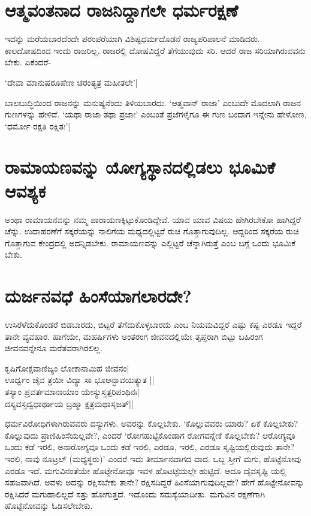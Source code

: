 \section*{ಆತ್ಮವಂತನಾದ ರಾಜನಿದ್ದಾಗಲೇ ಧರ್ಮರಕ್ಷಣೆ}

ಇದನ್ನು ಮರೆಯಬಾರದೆಂದೇ ಪರಂಪರೆಯಾಗಿ ವಿಶಿಷ್ಟಧರ್ಮದೊಡನೆ ರಾಜ್ಯಪರಿಪಾಲನೆ ಮಾಡಿದರು. ಕಾಲದೋಷದಿಂದ ಇಂದು ರಾಜರಿಲ್ಲ. ರಾಜರಲ್ಲಿ ದೋಷವಿದ್ದರೆ ತೆಗೆಯುವುದು ಸರಿ. ಆದರೆ ರಾಜ ಸರಿಯಾಗಿರುವವನು ಬೇಕು. ಏಕೆಂದರೆ-

\begin{shloka}
`ದೇವಾ ಮಾನುಷರೂಪೇಣ ಚರಂತ್ಯತ್ರ ಮಹೀತಲೇ'|
\end{shloka}

ಬಾಲಬುದ್ಧಿಯಿಂದ ರಾಜನನ್ನು ಮನುಷ್ಯನೆಂದು ತಿಳಿಯಬಾರದು. `ಆತ್ಮವಾನ್ ರಾಜಾ' ಎಂಬುದೇ ಮೊದಲಾಗಿ ರಾಜನ ಗುಣಗಳನ್ನು ಹೇಳಿದೆ. `ಯಥಾ ರಾಜಾ ತಥಾ ಪ್ರಜಾಃ' ಎಂಬಂತೆ ಪ್ರಜೆಗಳೈಗೂ ಈ ಗುಣ ಬಂದಾಗ ಇನ್ನೇನು ಹೇಳೋಣ, `ಧರ್ಮೋ ರಕ್ಷತಿ ರಕ್ಷಿತಃ'|

\section*{ರಾಮಾಯಣವನ್ನು ಯೋಗ್ಯಸ್ಥಾನದಲ್ಲಿಡಲು ಭೂಮಿಕೆ ಆವಶ್ಯಕ}

ಅಂಥಾ ರಾಮಾಯನವನ್ನು ನಮ್ಮ ಪಾರಾಯಣಕ್ಕಿಟ್ಟುಕೊಂಡಿದ್ದೇವೆ. ಯಾವ ಯಾವ ವಿಷಯ ಹೇಗಿರಬೇಕೋ ಹಾಗಿದ್ದರೆ ಚೆನ್ನು. ಉದಾಹರಣೆಗೆ ಸಕ್ಕರೆಯನ್ನು ನಾಲಿಗೆಯ ಮಧ್ಯದಲ್ಲಿಟ್ಟರೆ ರುಚಿ ಗೊತ್ತಾಗುವುದಿಲ್ಲ. ಆದ್ದರಿಂದ ಸಕ್ಕರೆಯ ರುಚಿ ಗೊತ್ತಾಗುವ ಕೇಂದ್ರದಲ್ಲಿ ಅದನ್ನಿಡಬೇಕು. ರಾಮಾಯಣವನ್ನು ಎಲ್ಲಿಟ್ಟರೆ ಚೆನ್ನಾಗಿರುತ್ತೆ ಎಂಬ ಬಗ್ಗೆ ಒಂದು ಭೂಮಿಕೆ ಬೇಕು.

\section*{ದುರ್ಜನವಧೆ ಹಿಂಸೆಯಾಗಲಾರದೇ?}

ಉಸಿರೆಳೆದುಕೊಂಡರೆ ಬಿಡಬಾರದು, ಬಿಟ್ಟರೆ ತೆಗೆದುಕೊಳ್ಳಬಾರದು ಎಂಬ ನಿಯಮವಿದ್ದರೆ ಎಷ್ಟು ಕಷ್ಟ ಎರಡೂ ಇದ್ದರೆ ತಾನೇ ವ್ಯವಹಾರ. ಹಾಗೆಯೇ, ಮಹರ್ಷಿಗಳು ಅಂತರಂಗ ಜೀವನದಲ್ಲಿಯೇ ತೃಪ್ತರಾಗಿ ಬಿಟ್ಟು ಬಹಿರಂಗ ಜೀವನವನ್ನೇನೂ ಮರೆತವರಾಗಿರಲಿಲ್ಲ.

\begin{shloka}
ಕೃಷಿಗೋಕ್ಷವಾಣಿಜ್ಯಂ ಲೋಕಾನಾಮಿಹ ಜೀವನಂ|\\
ಊರ್ಧ್ವಂ ಚೈವ ತ್ರಯೀ ವಿದ್ಯಾ ಸಾ‌ ಭೂಆನ್ಭಾವಯತ್ಯುತ ||\\
ತಸ್ಯಾಂ ಪ್ರವರ್ತಮಾನಾಯಾಂ ಯೇಸ್ಯುಸ್ತತ್ಪರಿಪಂಥಿನಃ|\\
ದಸ್ಯವಸ್ತದ್ವಧಾರ್ಥಾಯ ಬ್ರಹ್ಮಾ ಕ್ಷತ್ರಮಥಾಸೃಜತ್||
\end{shloka}
ಧರ್ಮವಿರೋಧಿಗಳಾಗಿರುವವರು ದಸ್ಯುಗಳು. ಅವರನ್ನು ಕೊಲ್ಲಬೇಕು. `ಕೊಲ್ಲುವವರು ಯಾರು? ಏಕೆ ಕೊಲ್ಲಬೇಕು? ಕೊಲ್ಲುವುದು ಪ್ರಾಣಿಹಿಂಸೆಯಲ್ಲವೇ?, ಎಂದರೆ `ರೋಗಹುಟ್ಟಿಕೊಂಡಾಗ ರೋಗವನ್ನೇಕೆ ಕೊಲ್ಲಬೇಕು? ಆರೋಗ್ಯವೂ ಒಂದು ಕಡೆ ಇರಲಿ, ಅನಾರೋಗ್ಯವೂ ಒಂದು ಕಡೆ ಇರಲಿ, ಎರಡೂ, ಇರಲಿ, ಎರಡೂ ಸೃಷ್ಟಿಯಲ್ಲಿರುವುದು ತಾನೇ? ಇರಲಿ, ನಾವು ನೂಟ್ರಲ್ (ಮಧ್ಯಸ್ಥರು)' ಎಂದರೆ ಇದು ತೀರ್ಮಾನವಾಗದ ವಾದ. ಒಬ್ಬ ಸ್ತೀಗೆ ಮಗು, ಹೊಟ್ಟೆನೋವು ಎರಡೂ ಇದೆ. ಮಗುವಿನಂತೆಯೇ ಹೊಟ್ಟೇನೋವೂ ಇವಳ ಹೊಟಟ್ಟೆಯಲ್ಲೇ ಹುಟ್ಟಿದೆ. ಆದೂ ದೈವಸೃಷ್ಟಿ ಯಲ್ಲಿ ಸಹಜವಾಗಿದೆ. ಅವಳು ಅದನ್ನು ರಕ್ಷಿಸಬೇಕು ತಾನೇ? ರಕ್ಷಿಸದಿದ್ದರೆ ಹಿಂಸೆಯಾಗುವುದಿಲ್ಲವೇ? ಹೇಗೆ ಹೊಟ್ಟೇನೋವನ್ನು ರಕ್ಷಿಸಿದರೆ ಮಗುಹಾಲಿಲ್ಲದೆ ಸತ್ತು ಹೋಗುತ್ತದೆ. ಇದೊಂದು ಸಮಸ್ಯೆಯಾದೀತು. ಮಗುವಿನ ರಕ್ಷಣೆಗಾಗಿ ಹೊಟ್ಟೆನೋವನ್ನು ಓಡಿಸಲೇಬೇಕು.

